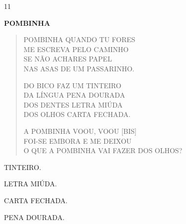 


\num{11}

\textbf{POMBINHA}

\begin{verse}
POMBINHA QUANDO TU FORES\\
ME ESCREVA PELO CAMINHO\\
SE NÃO ACHARES PAPEL\\
NAS ASAS DE UM PASSARINHO.

DO BICO FAZ UM TINTEIRO\\
DA LÍNGUA PENA DOURADA\\
DOS DENTES LETRA MIÚDA\\
DOS OLHOS CARTA FECHADA.

A POMBINHA VOOU, VOOU {[}BIS{]}\\
FOI-SE EMBORA E ME DEIXOU\\
O QUE A POMBINHA VAI FAZER DOS OLHOS?
\end{verse}

\begin{escolha}
\item TINTEIRO.

\item LETRA MIÚDA.

\item CARTA FECHADA.

\item PENA DOURADA.
\end{escolha}



